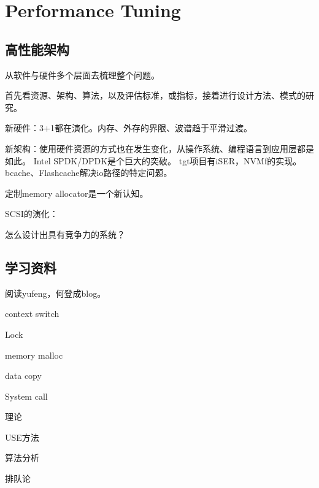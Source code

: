 \chapter{Performance Tuning}

\section{高性能架构}

从软件与硬件多个层面去梳理整个问题。

首先看资源、架构、算法，以及评估标准，或指标，接着进行设计方法、模式的研究。

新硬件：3+1都在演化。内存、外存的界限、波谱趋于平滑过渡。

新架构：使用硬件资源的方式也在发生变化，从操作系统、编程语言到应用层都是如此。
Intel SPDK/DPDK是个巨大的突破。
tgt项目有iSER，NVMf的实现。
bcache、Flashcache解决io路径的特定问题。

定制memory allocator是一个新认知。

SCSI的演化：

怎么设计出具有竞争力的系统？

\section{学习资料}

阅读yufeng，何登成blog。

\begin{enumbox}
\item context switch 
\item Lock 
\item memory malloc
\item data copy
\item System call 
\end{enumbox}

理论
\begin{enumbox}
\item USE方法
\item 算法分析
\item 排队论
\end{enumbox}

